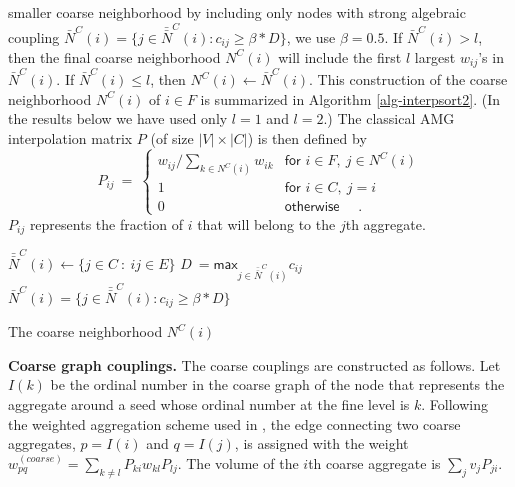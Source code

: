 \documentclass[final]{siamltex}
\begin{document}
smaller coarse neighborhood by including only nodes with strong
algebraic coupling ${\bar{N}}^C(i)=\{ j \in \bar{\bar{N}}^C(i) :
c_{ij} \geq \beta*D \}$, we use $\beta=0.5$. If ${\bar{N}}^C(i) > l$, then the final coarse
neighborhood ${N}^C(i)$ will include the first $l$ largest
$w_{ij}$'s in ${\bar{N}}^C(i)$. If ${\bar{N}}^C(i) \leq l$, then
$N^C(i) \leftarrow {\bar{N}}^C(i)$. This construction of the coarse
neighborhood $N^C(i)$ of $i \in F$ is summarized in Algorithm
\ref{alg-interpsort2}. (In the results below we have used only $l=1$ and $l=2$.)
The classical AMG interpolation matrix
$P$ (of size $|V|\times |C|$) is then defined by
\begin{equation}\label{interp-mat}
P_{ij}~=~ \left\{
  \begin{array}{lll}
  w_{ij}/\sum\limits_{k\in N^C(i)}w_{ik} & \textsf{for }i\in F , ~ j\in N^C(i) \\
  1               & \textsf{for }i\in C, ~ j=i \\
  0               & \textsf{otherwise} ~~~~~~.
  \end{array} \right.
\end{equation}
$P_{ij}$ represents the fraction of $i$ that will belong to the
$j$th aggregate.

\begin{algorithm}
\SetLine {} $\bar{\bar{N}}^{C}(i) \leftarrow \{ j \in
C~:~ ij \in E \}$\; $D~= \textsf{max}_{j \in \bar{\bar{N}}^{C}(i)}
c_{ij}$\; ${\bar{N}}^{C}(i)= \{ j \in \bar{\bar{N}}^{C}(i)  :
c_{ij} \geq \beta*D \}$\;
\SetVline
{}  \caption{The coarse neighborhood
$N^{C}(i)$}\label{alg-interpsort2}
\end{algorithm}


\par {\bf Coarse graph couplings.} The coarse couplings are constructed as follows. Let $I(k)$ be
the ordinal number in the coarse graph of the node that represents
the aggregate around a seed whose ordinal number at the fine level
is $k$. Following the weighted aggregation scheme used in
\cite{sharon}, the edge connecting two coarse aggregates, $p
=I(i)$ and $q=I(j)$, is assigned with the weight
$w_{pq}^{(coarse)}=\sum_{k\not= l}P_{ki}w_{kl}P_{lj}$. The volume
of the $i$th coarse aggregate is $\sum_j v_jP_{ji}$.
\end{document}
